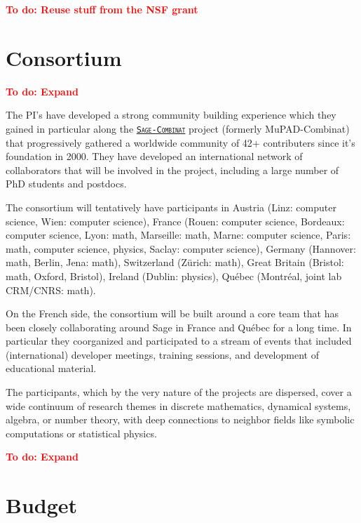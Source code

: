 \documentclass[a4,12pt]{amsart}
\newcommand{\sagecombinat}{\href{http://wiki.sagemath.org/combinat/}{\texttt{Sage-Combinat}}\xspace}
\newcommand{\TODO}[2][To do: ]{{\textcolor{red}{\textbf{#1#2}}}}
\newcommand{\CS}{computer science}
\begin{document}
\TODO{Reuse stuff from the NSF grant}

\section{Consortium}

\TODO{Expand}

The PI's have developed a strong community building experience which
they gained in particular along the \textsc{\sagecombinat} project
(formerly MuPAD-Combinat) that progressively gathered a worldwide
community of 42+ contributers since it's foundation in 2000. They have
developed an international network of collaborators that will be
involved in the project, including a large number of PhD students and
postdocs.

The consortium will tentatively have participants in Austria (Linz:
\CS, Wien: \CS), France (Rouen: \CS, Bordeaux: \CS, Lyon: math,
Marseille: math, Marne: \CS, Paris: math, \CS, physics, Saclay: \CS),
Germany (Hannover: math, Berlin, Jena: math), Switzerland (Zürich:
math), Great Britain (Bristol: math, Oxford, Bristol), Ireland
(Dublin: physics), Québec (Montréal, joint lab CRM/CNRS: math).

On the French side, the consortium will be built around a core team
that has been closely collaborating around Sage in France and Québec
for a long time.
In particular they coorganized and participated to a stream of events
that included (international) developer meetings, training sessions,
and development of educational material.

The participants, which by the very nature of the projects are
dispersed, cover a wide continuum of research themes in discrete
mathematics, dynamical systems, algebra, or number theory, with deep
connections to neighbor fields like symbolic computations or
statistical physics.

\TODO{Expand}



\section{Budget}
\end{document}
